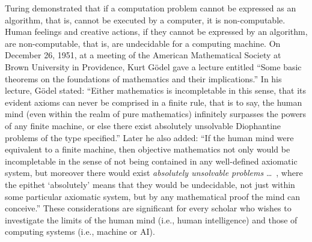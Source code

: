 Turing demonstrated that if a computation problem cannot be expressed as an algorithm, that is, cannot be executed by a computer, it is non-computable. Human feelings and creative actions, if they cannot be expressed by an algorithm, are non-computable, that is, are undecidable for a computing machine. On December 26, 1951, at a meeting of the American Mathematical Society at Brown University in Providence, Kurt G\"{o}del gave a lecture entitled ``Some basic theorems on the foundations of mathematics and their implications.'' In his lecture, G\"{o}del stated: ``Either mathematics is incompletable in this sense, that its evident axioms can never be comprised in a finite rule, that is to say, the human mind (even within the realm of pure mathematics) infinitely surpasses the powers of any finite machine, or else there exist absolutely unsolvable Diophantine problems of the type specified.'' Later he also added: ``If the human mind were equivalent to a finite machine, then objective mathematics not only would be incompletable in the sense of not being contained in any well-defined axiomatic system, but moreover there would exist \textit{absolutely unsolvable problems} \dots\ , where the epithet `absolutely' means that they would be undecidable, not just within some particular axiomatic system, but by any mathematical proof the mind can conceive.'' These considerations are significant for every scholar who wishes to investigate the limits of the human mind (i.e., human intelligence) and those of computing systems (i.e., machine or AI).

